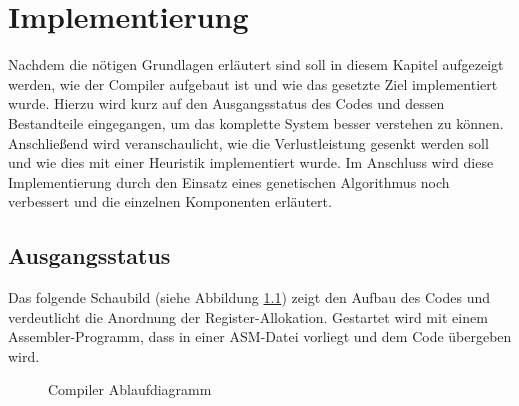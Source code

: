 \chapter{Implementierung}
\label{chap:Implementierung}
Nachdem die nötigen Grundlagen erläutert sind soll in diesem Kapitel aufgezeigt werden, wie der Compiler aufgebaut ist und wie das gesetzte Ziel implementiert wurde. Hierzu wird kurz auf den Ausgangsstatus des Codes und dessen Bestandteile eingegangen, um das komplette System besser verstehen zu können. Anschließend wird veranschaulicht, wie die Verlustleistung gesenkt werden soll und wie dies mit einer Heuristik implementiert wurde. Im Anschluss wird diese Implementierung durch den Einsatz eines genetischen Algorithmus noch verbessert und die einzelnen Komponenten erläutert.
\newpage
\section{Ausgangsstatus}
 Das folgende Schaubild (siehe Abbildung \ref{fig:flow_compiler}) zeigt den Aufbau des Codes und verdeutlicht die Anordnung der Register-Allokation. Gestartet wird mit einem Assembler-Programm, dass in einer ASM-Datei vorliegt und dem Code übergeben wird.
 
 
%			

\begin{scriptsize}
	\begin{figure}[htbp] 
		\centering
		
		\caption{Compiler Ablaufdiagramm}
		\label{fig:flow_compiler}
	\end{figure}
\end{scriptsize}

